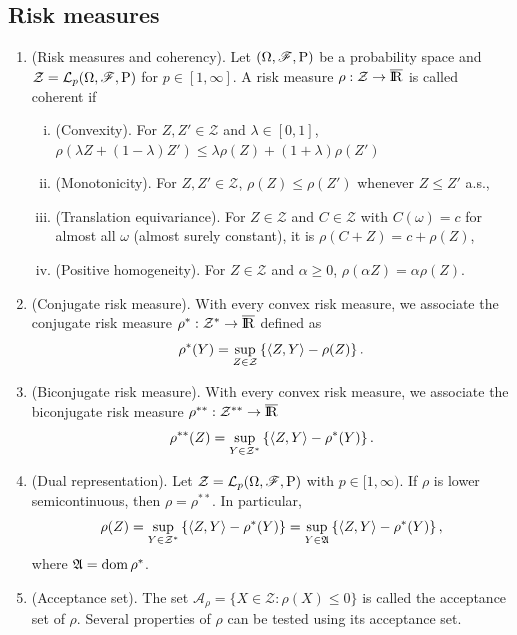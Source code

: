 \documentclass[a4paper,10pt]{article}
\begin{document}
\subsection{Risk measures}
\begin{enumerate}
 \item (Risk measures and coherency). Let $(\Omega,\mathscr{F},\mathrm{P})$ be a probability space and 
       $\mathcal{Z}=\mathcal{L}_p(\Omega,\mathscr{F},\mathrm{P})$ for $p\in[1,\infty]$. A risk measure 
       $\rho:\mathcal{Z}\to\barre$ is called coherent if
       \begin{enumerate}[i.]
        \item (Convexity). For $Z,Z'\in\mathcal{Z}$ and $\lambda\in[0,1]$, $\rho(\lambda Z + (1-\lambda)Z') 
              \leq \lambda \rho(Z) + (1+\lambda) \rho(Z')$
        \item (Monotonicity). For $Z,Z'\in\mathcal{Z}$, $\rho(Z)\leq \rho(Z')$ whenever $Z\leq Z'$ a.s.,
        \item (Translation equivariance). For $Z\in\mathcal{Z}$ and $C\in \mathcal{Z}$ with $C(\omega)=c$
              for almost all $\omega$ (almost surely constant), it is $\rho(C+Z) = c + \rho(Z)$,
        \item (Positive homogeneity). For $Z\in\mathcal{Z}$ and $\alpha \geq 0$, $\rho(\alpha Z) = \alpha \rho(Z)$.
       \end{enumerate}   
 \item (Conjugate risk measure). With every convex risk measure, we associate the conjugate risk measure 
       $\rho^*:\mathcal{Z}^*\to\barre$ defined as
       \[
        \rho^*(Y) = \sup_{Z\in\mathcal{Z}} \left\{\langle Z,Y\rangle - \rho(Z) \right\}.
       \]
 \item (Biconjugate risk measure). With every convex risk measure,  we associate the biconjugate risk measure        
       $\rho^{**}:\mathcal{Z}^{**}\to\barre$
       \[
        \rho^{**}(Z) = \sup_{Y\in\mathcal{Z}^*} \left\{\langle Z,Y\rangle - \rho^{*}(Y) \right\}.
       \]
 \item (Dual representation). Let $\mathcal{Z}=\mathcal{L}_p(\Omega,\mathscr{F},\mathrm{P})$ with $p\in[1,\infty)$.
       If $\rho$ is lower semicontinuous, then $\rho = \rho^{**}$. In particular,
       \[
        \rho(Z) = \sup_{Y\in\mathcal{Z}^*} \left\{\langle Z,Y\rangle - \rho^{*}(Y) \right\} 
                = \sup_{Y\in\mathfrak{A}} \left\{\langle Z,Y\rangle - \rho^{*}(Y) \right\},
       \]
       where $\mathfrak{A} = \operatorname{dom} \rho^*$.
       
 \item (Acceptance set). The set $\mathcal{A}_\rho = \{X\in\mathcal{Z} : \rho(X)\leq 0\}$ is called the acceptance 
       set of $\rho$. Several properties of $\rho$ can be tested using its acceptance set.
       

\end{enumerate}
\end{document}
